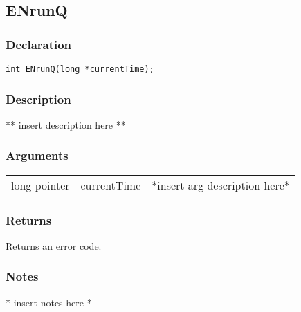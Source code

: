 \subsection{ENrunQ}
\subsubsection{Declaration}
\begin{lstlisting}
int ENrunQ(long *currentTime);
\end{lstlisting}
\subsubsection{Description}
** insert description here **
\subsubsection{Arguments}
\begin{tabular}{l r p{11cm} }
long pointer&currentTime&*insert arg description here* \\[6pt]
\end{tabular}
\subsubsection{Returns}
Returns an error code.
\subsubsection{Notes}
* insert notes here *